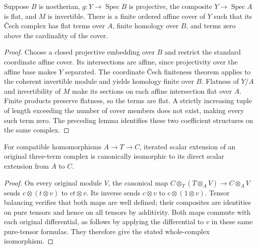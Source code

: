 \begin{lemma}
\label{lem:relative-arithmetic-coordinate-complex}
\leanok
Suppose $B$ is noetherian, $g:Y\to\operatorname{Spec}B$ is projective,
the composite $Y\to\operatorname{Spec}A$ is flat, and $M$ is invertible.
There is a finite ordered affine cover of $Y$ such that its Čech complex
has flat terms over $A$, finite homology over $B$, and terms zero above
the cardinality of the cover.
\end{lemma}
\begin{proof}
Choose a closed projective embedding over $B$ and restrict the standard
coordinate affine cover. Its intersections are affine, since projectivity
over the affine base makes $Y$ separated. The coordinate Čech finiteness
theorem applies to the coherent invertible module and yields homology
finite over $B$. Flatness of $Y/A$ and invertibility of $M$ make its
sections on each affine intersection flat over $A$. Finite products
preserve flatness, so the terms are flat. A strictly increasing tuple
of length exceeding the number of cover members does not exist, making
every such term zero. The preceding lemma identifies these two coefficient
structures on the same complex.
\end{proof}

\begin{lemma}
\label{lem:relative-arithmetic-scalar-tower-complex}
\leanok
For compatible homomorphisms $A\to T\to C$, iterated scalar extension of
an original three-term complex is canonically isomorphic to its direct
scalar extension from $A$ to $C$.
\end{lemma}
\begin{proof}
On every original module $V$, the canonical map
$C\otimes_T(T\otimes_A V)\to C\otimes_A V$ sends
$c\otimes(t\otimes v)$ to $ct\otimes v$. Its inverse sends
$c\otimes v$ to $c\otimes(1\otimes v)$. Tensor balancing verifies that
both maps are well defined; their composites are identities on pure
tensors and hence on all tensors by additivity. Both maps commute with
each original differential, as follows by applying the differential to
$v$ in these same pure-tensor formulas. They therefore give the stated
whole-complex isomorphism.
\end{proof}

